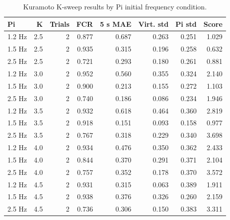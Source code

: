 \begin{table}[htbp]
\centering
\footnotesize
\caption{Kuramoto K-sweep results by Pi initial frequency condition.}
\label{tab:k_sweep_condition}
\begin{tabular}{@{}lrrrrrrr@{}}
\toprule
\textbf{Pi} & \textbf{K} & \textbf{Trials} & \textbf{FCR} & \textbf{5 s MAE} & \textbf{Virt. std} & \textbf{Pi std} & \textbf{Score} \\
\midrule
1.2 Hz & 2.5 & 2 & 0.877 & 0.687 & 0.263 & 0.251 & 1.029 \\
1.5 Hz & 2.5 & 2 & 0.935 & 0.315 & 0.196 & 0.258 & 0.632 \\
2.5 Hz & 2.5 & 2 & 0.721 & 0.293 & 0.180 & 0.261 & 0.881 \\
1.2 Hz & 3.0 & 2 & 0.952 & 0.560 & 0.355 & 0.324 & 2.140 \\
1.5 Hz & 3.0 & 2 & 0.900 & 0.213 & 0.155 & 0.272 & 1.103 \\
2.5 Hz & 3.0 & 2 & 0.740 & 0.186 & 0.086 & 0.234 & 1.946 \\
1.2 Hz & 3.5 & 2 & 0.932 & 0.618 & 0.464 & 0.360 & 2.819 \\
1.5 Hz & 3.5 & 2 & 0.918 & 0.151 & 0.093 & 0.158 & 0.977 \\
2.5 Hz & 3.5 & 2 & 0.767 & 0.318 & 0.229 & 0.340 & 3.698 \\
1.2 Hz & 4.0 & 2 & 0.934 & 0.476 & 0.350 & 0.362 & 2.433 \\
1.5 Hz & 4.0 & 2 & 0.844 & 0.370 & 0.291 & 0.371 & 2.104 \\
2.5 Hz & 4.0 & 2 & 0.757 & 0.352 & 0.178 & 0.370 & 3.572 \\
1.2 Hz & 4.5 & 2 & 0.931 & 0.315 & 0.063 & 0.389 & 1.911 \\
1.5 Hz & 4.5 & 2 & 0.938 & 0.376 & 0.326 & 0.260 & 2.159 \\
2.5 Hz & 4.5 & 2 & 0.736 & 0.306 & 0.150 & 0.383 & 3.311 \\
\bottomrule
\end{tabular}
\end{table}
